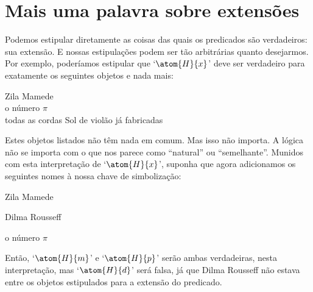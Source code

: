 \section{Mais uma palavra sobre extensões}
Podemos estipular diretamente as coisas das quais os predicados são verdadeiros: sua extensão.
E nossas estipulações podem ser tão arbitrárias quanto desejarmos.
Por exemplo, poderíamos estipular que `$\atom{H}{x}$' deve ser verdadeiro para exatamente os seguintes objetos e nada mais:
	\begin{center}
		Zila Mamede\\
		o número $\pi$\\
		todas as cordas Sol de violão já fabricadas
	\end{center}
Estes objetos listados não têm nada em comum.
Mas isso não importa.
A lógica não se importa com o que nos parece como ``natural'' ou ``semelhante''.
Munidos com esta interpretação de `$\atom{H}{x}$', suponha que agora adicionamos os seguintes nomes à nossa chave de simbolização:
	\begin{ekey}
		\item[m] Zila Mamede
		\item[d] Dilma Rousseff
		\item[p] o número $\pi$
	\end{ekey}
Então, `$\atom{H}{m}$' e `$\atom{H}{p}$' serão ambas verdadeiras, nesta interpretação, mas `$\atom{H}{d}$' será falsa, já que Dilma Rousseff não estava entre os objetos estipulados para a extensão do predicado.


